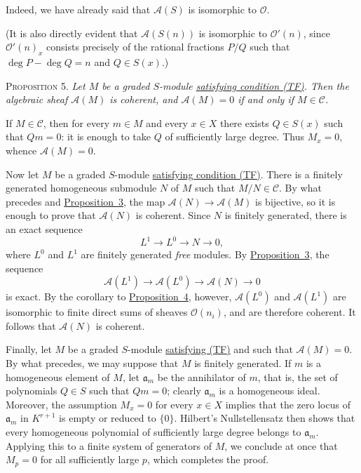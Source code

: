 Indeed, we have already said that $\mathcal{A}(S)$ is isomorphic to
$\mathcal{O}$.

(It is also directly evident that $\mathcal{A}(S(n))$ is isomorphic to
$\mathcal{O}'(n)$, since $\mathcal{O}'(n)_x$ consists precisely of the
rational fractions $P/Q$ such that
$\deg P-\deg Q=n$ and $Q\in S(x)$.)

\label{fac:III:2:no:58:prop:5}
\textsc{Proposition 5.} \textit{Let $M$ be a graded $S$-module
\hyperref[fac:III:2:no:56:def:TF]{satisfying condition (TF)}. Then the algebraic
sheaf $\mathcal{A}(M)$ is coherent, and $\mathcal{A}(M)=0$ if and only if
$M\in\mathcal{C}$.}

If $M\in\mathcal{C}$, then for every $m\in M$ and every $x\in X$ there
exists $Q\in S(x)$ such that $Qm=0$: it is enough to take $Q$ of
sufficiently large degree. Thus $M_x=0$, whence $\mathcal{A}(M)=0$.

Now let $M$ be a graded $S$-module
\hyperref[fac:III:2:no:56:def:TF]{satisfying condition (TF)}. There is a
finitely generated homogeneous submodule $N$ of $M$ such that
$M/N\in\mathcal{C}$. By what precedes and
\hyperref[fac:III:2:no:58:prop:3]{Proposition~3}, the map
$\mathcal{A}(N)\to\mathcal{A}(M)$ is bijective, so it is enough to prove
that $\mathcal{A}(N)$ is coherent. Since $N$ is finitely generated, there
is an exact sequence
\label{fac:III:2:no:58:formula:free-presentation}
\[
L^1\longrightarrow L^0\longrightarrow N\longrightarrow0,
\]
where $L^0$ and $L^1$ are finitely generated \textit{free} modules. By
\hyperref[fac:III:2:no:58:prop:3]{Proposition~3}, the sequence
\label{fac:III:2:no:58:formula:sheaf-presentation}
\[
\mathcal{A}(L^1)\longrightarrow\mathcal{A}(L^0)
\longrightarrow\mathcal{A}(N)\longrightarrow0
\]
is exact. By the corollary to
\hyperref[fac:III:2:no:58:prop:4]{Proposition~4}, however,
$\mathcal{A}(L^0)$ and $\mathcal{A}(L^1)$ are isomorphic to finite direct
sums of sheaves $\mathcal{O}(n_i)$, and are therefore coherent. It follows
that $\mathcal{A}(N)$ is coherent.

Finally, let $M$ be a graded $S$-module
\hyperref[fac:III:2:no:56:def:TF]{satisfying (TF)} and such that
$\mathcal{A}(M)=0$. By what precedes, we may suppose that $M$ is finitely
generated. If $m$ is a homogeneous element of $M$, let
$\mathfrak{a}_m$ be the annihilator of $m$, that is, the set of
polynomials $Q\in S$ such that $Qm=0$; clearly $\mathfrak{a}_m$ is a
homogeneous ideal. Moreover, the assumption $M_x=0$ for every $x\in X$
implies that the zero locus of $\mathfrak{a}_m$ in $K^{r+1}$ is empty or
reduced to $\{0\}$. Hilbert's Nullstellensatz then shows that every
homogeneous polynomial of sufficiently large degree belongs to
$\mathfrak{a}_m$. Applying this to a finite system of generators of $M$,
we conclude at once that $M_p=0$ for all sufficiently large $p$, which
completes the proof.

